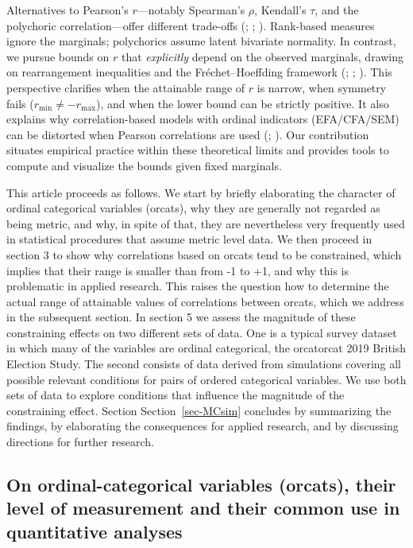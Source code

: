 \documentclass[
  12pt,
]{article}
\theoremstyle{plain}
\theoremstyle{definition}
\theoremstyle{remark}
\begin{document}
Alternatives to Pearson’s \(r\)—notably Spearman’s \(\rho\), Kendall’s \(\tau\), and the polychoric correlation—offer different trade-offs (\autocite{Spearman1904}; \autocite{Kendall1938}; \autocite{Olsson1979}). Rank-based measures ignore the marginals; polychorics assume latent bivariate normality. In contrast, we pursue bounds on \(r\) that \emph{explicitly} depend on the observed marginals, drawing on rearrangement inequalities and the Fréchet–Hoeffding framework (\autocite{Frechet1951}; \autocite{Hoeffding1940}; \autocite{Rueschendorf1981}). This perspective clarifies when the attainable range of \(r\) is narrow, when symmetry fails (\(r_{\min}\neq -r_{\max}\)), and when the lower bound can be strictly positive. It also explains why correlation-based models with ordinal indicators (EFA/CFA/SEM) can be distorted when Pearson correlations are used (\autocite{FloraCurran2004}; \autocite{GreenEtAl1997}). Our contribution situates empirical practice within these theoretical limits and provides tools to compute and visualize the bounds given fixed marginals.

This article proceeds as follows. We start by briefly elaborating the
character of ordinal categorical variables (orcats), why they are
generally not regarded as being metric, and why, in spite of that, they
are nevertheless very frequently used in statistical procedures that
assume metric level data. We then proceed in section 3 to show why
correlations based on orcats tend to be constrained, which implies that
their range is smaller than from -1 to +1, and why this is problematic
in applied research. This raises the question how to determine the
actual range of attainable values of correlations between orcats, which
we address in the subsequent section. In section 5 we assess the
magnitude of these constraining effects on two different sets of data.
One is a typical survey dataset in which many of the variables are
ordinal categorical, the orcatorcat 2019 British Election Study. The
second consists of data derived from simulations covering all possible
relevant conditions for pairs of ordered categorical variables. We use
both sets of data to explore conditions that influence the magnitude of
the constraining effect. Section Section~\ref{sec-MCsim} concludes by
summarizing the findings, by elaborating the consequences for applied
research, and by discussing directions for further research.

\subsection{On ordinal-categorical variables (orcats), their level of
measurement and their common use in quantitative
analyses}\label{on-ordinal-categorical-variables-orcats-their-level-of-measurement-and-their-common-use-in-quantitative-analyses}
\end{document}
